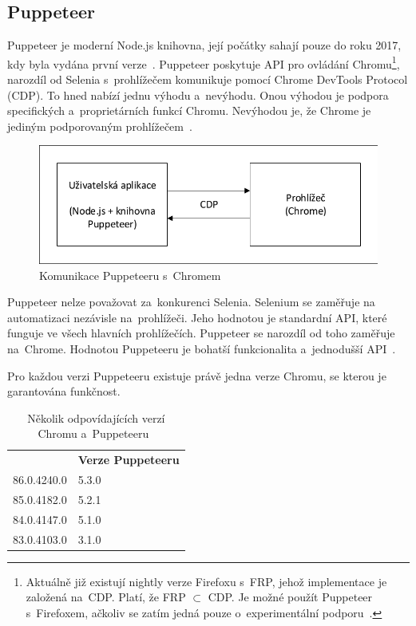 \documentclass[12pt, a4paper, twoside]{article}
\begin{document}
	\subsection{Puppeteer}
	\label{sub_sec:Puppeteer}
	Puppeteer je moderní Node.js knihovna, její počátky sahají pouze do roku 2017, kdy byla vydána první verze~\cite{puppeteerFirstRelease}. Puppeteer poskytuje API pro ovládání Chromu\footnote{Aktuálně již existují nightly verze Firefoxu s~FRP, jehož implementace je založená na~CDP. Platí, že FRP $\subset$ CDP. Je možné použít Puppeteer s~Firefoxem, ačkoliv se zatím jedná pouze o~experimentální podporu~\cite{firefoxRemoteProtocol, firefoxRemoteProtocol2}.}, narozdíl od Selenia s~prohlížečem komunikuje pomocí Chrome DevTools Protocol (CDP). To hned nabízí jednu výhodu a~nevýhodu. Onou výhodou je podpora specifických a~proprietárních funkcí Chromu. Nevýhodou je, že Chrome je jediným podporovaným prohlížečem~\cite{puppeteerMainPage}.
	\begin{figure}[H]
		\centering	
		\includegraphics[width=1.0\textwidth]{puppeteerCom.pdf}
		\caption{Komunikace Puppeteeru s~Chromem}
	\end{figure}

	Puppeteer nelze považovat za~konkurenci Selenia. Selenium se zaměřuje na~ automatizaci nezávisle na~prohlížeči. Jeho hodnotou je standardní API, které funguje ve všech hlavních prohlížečích. Puppeteer se narozdíl od toho zaměřuje na~Chrome. Hodnotou Puppeteeru je bohatší funkcionalita a~jednodušší API~\cite{puppeteerMainPage}. 
	
	Pro každou verzi Puppeteeru existuje právě jedna verze Chromu, se kterou je garantována funkčnost. 
	\begin{table}[H]
		\centering
		\begin{tabular}{ l|l } 
			\rowcolor{tableHeadingBackground}
			\multicolumn{1}{l}{\textbf{Verze Chromu}} & \multicolumn{1}{l}{\textbf{Verze Puppeteeru}} \\
			86.0.4240.0 & 5.3.0 \\ 
			85.0.4182.0 & 5.2.1 \\
			84.0.4147.0 & 5.1.0 \\
			83.0.4103.0 & 3.1.0
		\end{tabular}
		\caption{Několik odpovídajících verzí Chromu a~Puppeteeru~\cite{puppeteerApi}}
	\end{table}
\end{document}
